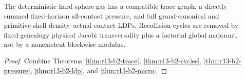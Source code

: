 \begin{theorem}
\label{thm:r13-b2-main}
The deterministic hard-sphere gas has a compatible trace graph, a directly
summed fixed-horizon all-contact pressure, and full grand-canonical and
primitive-shell density--actual-contact LDPs.  Recollision cycles are removed
by fixed-genealogy physical Jacobi transversality plus a factorial global
majorant, not by a nonexistent blockwise modulus.
\end{theorem}

\begin{proof}
Combine Theorems~\ref{thm:r13-b2-trace},
\ref{thm:r13-b2-cycles}, \ref{thm:r13-b2-pressure},
\ref{thm:r13-b2-ldp}, and \ref{thm:r13-b2-micro}.
\end{proof}
